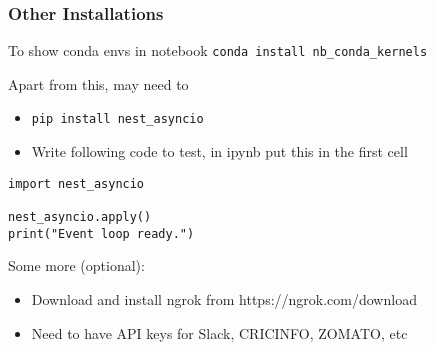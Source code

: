  \begin{frame}[fragile]\frametitle{Other Installations}
To show conda envs in notebook \lstinline|conda install nb_conda_kernels|

Apart from this, may need to
\begin{itemize}
\item \lstinline|pip install nest_asyncio|
\item Write following code to test, in ipynb put this in the first cell
\end{itemize}


\begin{lstlisting}
import nest_asyncio

nest_asyncio.apply()
print("Event loop ready.")
\end{lstlisting}

Some more (optional):
\begin{itemize}
\item Download and install ngrok from https://ngrok.com/download
\item Need to have API keys for Slack, CRICINFO, ZOMATO, etc
\end{itemize}
 
\end{frame}




